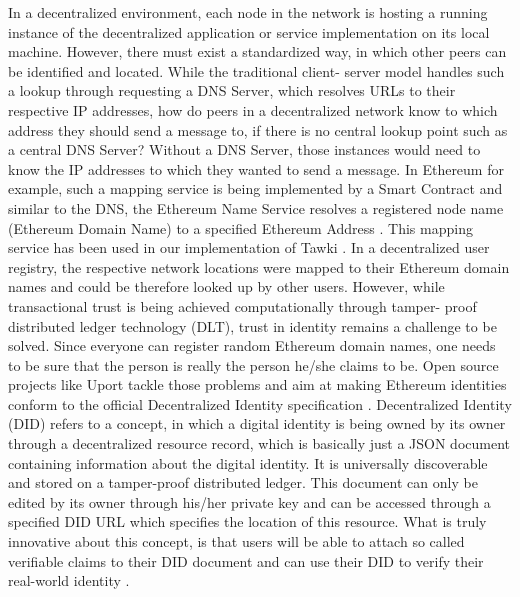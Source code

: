 In a decentralized environment, each node in the network is hosting a running instance of the decentralized application or service implementation on its local machine. However, there must exist a standardized way, in which other peers can be identified and located. While the traditional client- server model handles such a lookup through requesting a DNS Server, which resolves URLs to their respective IP addresses, how do peers in a decentralized network know to which address they should send a message to, if there is no central lookup point such as a central DNS Server? Without a DNS Server, those instances would need to know the IP addresses to which they wanted to send a message. In Ethereum for example, such a mapping service is being implemented by a Smart Contract and similar to the DNS, the Ethereum Name Service resolves a registered node name (Ethereum Domain Name) to a specified Ethereum Address \cite{Introduction}. %
This mapping service has been used in our implementation of Tawki \cite{westerkampTawkiSelfSovereignSocial2019}. In a decentralized user registry, the respective network locations were mapped to their Ethereum domain names and could be therefore looked up by other users. However, while transactional trust is being achieved computationally through tamper- proof distributed ledger technology (DLT), trust in identity remains a challenge to be solved. Since everyone can register random Ethereum domain names, one needs to be sure that the person is really the person he/she claims to be. Open source projects like Uport tackle those problems and aim at making Ethereum identities conform to the official Decentralized Identity specification \cite{UPort}.
Decentralized Identity (DID) refers to a concept, in which a digital identity is being owned by its owner through a decentralized resource record, which is basically just a JSON document containing information about the digital identity. It is universally discoverable and stored on a tamper-proof distributed ledger. This document can only be edited by its owner through his/her private key and can be accessed through a specified DID URL which specifies the location of this resource. What is truly innovative about this concept, is that users will be able to attach so called verifiable claims to their DID document and can use their DID to verify their real-world identity \cite{DecentralizedIdentifiersDIDs}. 
